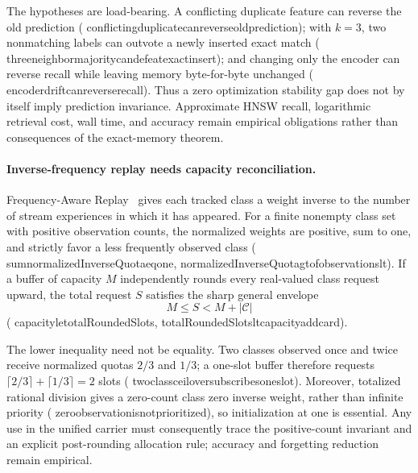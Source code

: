 \documentclass[11pt]{article}
\newcommand{\leanname}[1]{{\scriptsize\ttfamily
  \def\_{\textunderscore\allowbreak}#1}}
\begin{document}
The hypotheses are load-bearing.  A conflicting duplicate feature can reverse
the old prediction
(\leanname{conflicting\_duplicate\_can\_reverse\_old\_prediction}); with
$k=3$, two nonmatching labels can outvote a newly inserted exact match
(\leanname{three\_neighbor\_majority\_can\_defeat\_exact\_insert}); and changing
only the encoder can reverse recall while leaving memory byte-for-byte
unchanged
(\leanname{encoder\_drift\_can\_reverse\_recall}). Thus a zero optimization
stability gap does not by itself imply prediction invariance. Approximate HNSW
recall, logarithmic retrieval cost, wall time, and accuracy remain empirical
obligations rather than consequences of the exact-memory theorem.

\paragraph{Inverse-frequency replay needs capacity reconciliation.}
Frequency-Aware Replay~\cite{hemati2023cir} gives each tracked class a weight
inverse to the number of stream experiences in which it has appeared. For a
finite nonempty class set with positive observation counts, the normalized
weights are positive, sum to one, and strictly favor a less frequently
observed class
(\leanname{sum\_normalizedInverseQuota\_eq\_one},
\leanname{normalizedInverseQuota\_gt\_of\_observations\_lt}).
If a buffer of capacity $M$ independently rounds every real-valued class
request upward, the total request $S$ satisfies the sharp general envelope
\[
  M \le S < M + |\mathcal C|
\]
(\leanname{capacity\_le\_totalRoundedSlots},
\leanname{totalRoundedSlots\_lt\_capacity\_add\_card}).

The lower inequality need not be equality. Two classes observed once and
twice receive normalized quotas $2/3$ and $1/3$; a one-slot buffer therefore
requests $\lceil2/3\rceil+\lceil1/3\rceil=2$ slots
(\leanname{two\_class\_ceil\_oversubscribes\_one\_slot}). Moreover, totalized
rational division gives a zero-count class zero inverse weight, rather than
infinite priority
(\leanname{zero\_observation\_is\_not\_prioritized}), so initialization at one
is essential. Any use in the unified carrier must consequently trace the
positive-count invariant and an explicit post-rounding allocation rule;
accuracy and forgetting reduction remain empirical.
\end{document}
